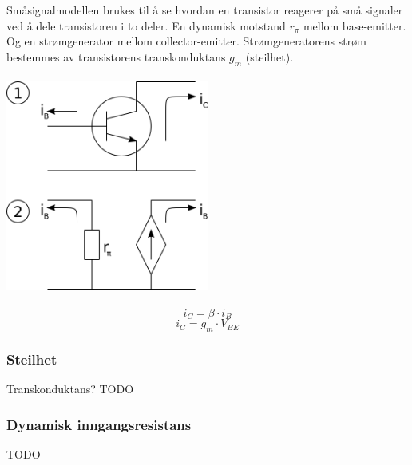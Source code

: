 Småsignalmodellen brukes til å se hvordan en transistor
reagerer på små signaler ved å dele transistoren i to deler.
En dynamisk motstand $r_\pi$ mellom base-emitter.
Og en strømgenerator mellom collector-emitter.
Strømgeneratorens strøm bestemmes av transistorens
transkonduktans $g_m$ (steilhet).
\\\\
\includegraphics[width=0.5\textwidth]{./img/smasignal}
\\\\
$$i_C = \beta \cdot i_B$$
$$i_C = g_m \cdot V_{BE}$$

\subsubsection{Steilhet}
Transkonduktans?
TODO

\subsubsection{Dynamisk inngangsresistans}
TODO
